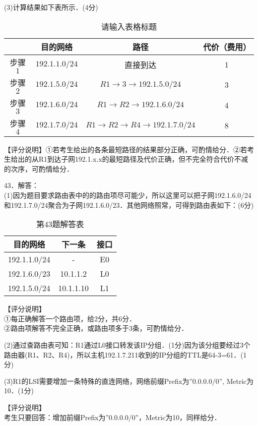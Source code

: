 (3)计算结果如下表所示．(4分) \\
\begin{table}[ht]
\centering
\caption{请输入表格标题}\label{CSN14_tab5}
\begin{tabular}{|c|c|c|c|}
\hline
 & 目的网络 & 路径 & 代价（费用）  \\
\hline
步骤$1$ & $192.1.1.0/24$ & 直接到达 & $1$  \\
\hline
步骤$2$ & $192.1.5.0/24$ & $R1 \rightarrow 3 \rightarrow 192.1.5.0/24$ & $3$  \\
\hline
步骤$3$ & $192.1.6.0/24$ & $R1\rightarrow R2\rightarrow 192.1.6.0/24$ & $4$  \\
\hline
步骤$4$ & $192.1.7.0/24$ & $R1 \rightarrow R2 \rightarrow R4 \rightarrow 192.1.7.0/24$ & $8$  \\
\hline
\end{tabular}
\end{table}
【评分说明】①若考生给出的各条最短路径的结果部分正确，可酌情给分．②若考生给出的从R1到达子网192.1.x.x的最短路径及代价正确，但不完全符合代价不减的次序，可酌情给分．

43．解答： \\
(1)因为题目要求路由表中的的路由项尽可能少，所以这里可以把子网192.1.6.0/24和192.1.7.0/24聚合为子网192.1.6.0/23．其他网络照常，可得到路由表如下：(6分)

\begin{table}[ht]
\centering
\caption{第43题解答表}\label{CSN14_tab6}
\begin{tabular}{|c|c|c|}
\hline
目的网络 & 下一条 & 接口 \\
\hline
192.1.1.0/24 & - & E0 \\
\hline
192.1.6.0/23 & 10.1.1.2 & L0 \\
\hline
192.1.5.0/24 & 10.1.1.10 & L1 \\
\hline
\end{tabular}
\end{table}
【评分说明】 \\
①每正确解答一个路由项，给2分，共6分．  \\
②路由项解答不完全正确，或路由项多于3条，可酌情给分．

(2)通过查路由表可知：R1通过L0接口转发该IP分组．(1分)因为该分组要经过3个路由器(R1、R2、R4)，所以主机192.1.7.211收到的IP分组的TTL是64-3=61．(1分)

(3)R1的LSI需要增加一条特殊的直连网络，网络前缀Prefix为”0.0.0.0/0”, Metric为10．(1分)

【评分说明】 \\
考生只要回答：增加前缀Prefix为”0.0.0.0/0”，Metric为10，同样给分．